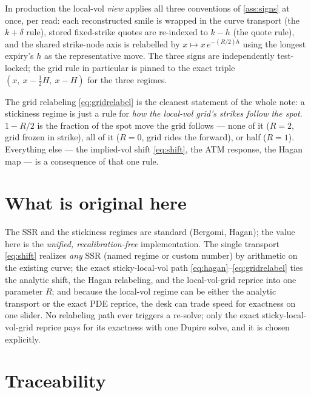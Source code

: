 \documentclass[11pt]{article}
\begin{document}
In production the local-vol \emph{view} applies all three conventions of
\cref{ass:signs} at once, per read: each reconstructed smile is wrapped in
the curve transport (the $k+\delta$ rule), stored fixed-strike quotes are
re-indexed to $k-h$ (the quote rule), and the shared strike-node axis is
relabelled by $x\mapsto x\,e^{-(R/2)h}$ using the longest expiry's $h$ as the
representative move. The three signs are independently test-locked; the grid
rule in particular is pinned to the exact triple $(x,\ x-\tfrac12H,\ x-H)$
for the three regimes.

\begin{heuristic}
The grid relabeling \eqref{eq:gridrelabel} is the cleanest statement of the whole
note: a stickiness regime is just a rule for \emph{how the local-vol grid's strikes
follow the spot}. $1-R/2$ is the fraction of the spot move the grid follows --- none
of it ($R=2$, grid frozen in strike), all of it ($R=0$, grid rides the forward), or
half ($R=1$). Everything else --- the implied-vol shift \eqref{eq:shift}, the ATM
response, the Hagan map --- is a consequence of that one rule.
\end{heuristic}

\section{What is original here}
\label{sec:original}

The SSR and the stickiness regimes are standard (Bergomi, Hagan); the value here is
the \emph{unified, recalibration-free} implementation. The single transport
\eqref{eq:shift} realizes \emph{any} SSR (named regime or custom number) by
arithmetic on the existing curve; the exact sticky-local-vol path
\eqref{eq:hagan}--\eqref{eq:gridrelabel} ties the analytic shift, the Hagan
relabeling, and the local-vol-grid reprice into one parameter $R$; and because the
local-vol regime can be either the analytic transport or the exact PDE reprice, the
desk can trade speed for exactness on one slider. No relabeling path ever triggers
a re-solve; only the exact sticky-local-vol-grid reprice pays for its exactness
with one Dupire solve, and it is chosen explicitly.

\section{Traceability}
\label{sec:traceability}
\end{document}
